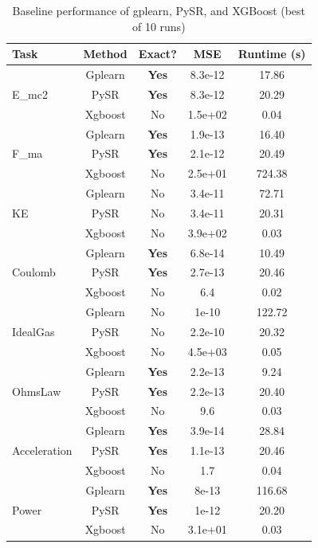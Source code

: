 \begin{table}[H]
\centering
\caption{Baseline performance of gplearn, PySR, and XGBoost (best of 10 runs)}
\label{tab:baselines_gp_pysr}
\begin{tabular}{lcccc}
\toprule
Task & Method & Exact? & MSE & Runtime (s) \\
\midrule
\multirow{3}{*}{E_mc2}
& Gplearn & \textbf{Yes} & 8.3e-12 & 17.86 \\
& PySR & \textbf{Yes} & 8.3e-12 & 20.29 \\
& Xgboost & No & 1.5e+02 & 0.04 \\
\midrule
\multirow{3}{*}{F_ma}
& Gplearn & \textbf{Yes} & 1.9e-13 & 16.40 \\
& PySR & \textbf{Yes} & 2.1e-12 & 20.49 \\
& Xgboost & No & 2.5e+01 & 724.38 \\
\midrule
\multirow{3}{*}{KE}
& Gplearn & No & 3.4e-11 & 72.71 \\
& PySR & No & 3.4e-11 & 20.31 \\
& Xgboost & No & 3.9e+02 & 0.03 \\
\midrule
\multirow{3}{*}{Coulomb}
& Gplearn & \textbf{Yes} & 6.8e-14 & 10.49 \\
& PySR & \textbf{Yes} & 2.7e-13 & 20.46 \\
& Xgboost & No & 6.4 & 0.02 \\
\midrule
\multirow{3}{*}{IdealGas}
& Gplearn & No & 1e-10 & 122.72 \\
& PySR & No & 2.2e-10 & 20.32 \\
& Xgboost & No & 4.5e+03 & 0.05 \\
\midrule
\multirow{3}{*}{OhmsLaw}
& Gplearn & \textbf{Yes} & 2.2e-13 & 9.24 \\
& PySR & \textbf{Yes} & 2.2e-13 & 20.40 \\
& Xgboost & No & 9.6 & 0.03 \\
\midrule
\multirow{3}{*}{Acceleration}
& Gplearn & \textbf{Yes} & 3.9e-14 & 28.84 \\
& PySR & \textbf{Yes} & 1.1e-13 & 20.46 \\
& Xgboost & No & 1.7 & 0.04 \\
\midrule
\multirow{3}{*}{Power}
& Gplearn & \textbf{Yes} & 8e-13 & 116.68 \\
& PySR & \textbf{Yes} & 1e-12 & 20.20 \\
& Xgboost & No & 3.1e+01 & 0.03 \\
\bottomrule
\end{tabular}
\end{table}
